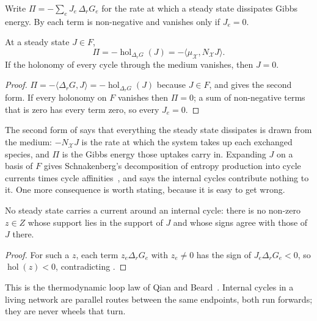 Write $\Pi=-\sum_e J_e\,\Delta_rG_e$ for the rate at which a steady state
dissipates Gibbs energy. By  each term is
non-negative and vanishes only if $J_e=0$. \lnkD

\begin{theorem}
\label{c1:thm-nocurrent}
\lnkD{} At a steady state $J\in F$,
\begin{equation}
\Pi=-\operatorname{hol}_{\Delta_rG}(J)
=-\langle\mu_{\mathcal X},N_{\mathcal X}J\rangle .
\label{c1:eq-power}
\end{equation}
If the holonomy of every cycle through the medium vanishes, then $J=0$.
\end{theorem}

\begin{proof}
$\Pi=-\langle\Delta_rG,J\rangle=-\operatorname{hol}_{\Delta_rG}(J)$ because
$J\in F$, and  gives the second form. If every holonomy
on $F$ vanishes then $\Pi=0$; a sum of non-negative terms that is zero has
every term zero, so every $J_e=0$.
\end{proof}

The second form of  says that everything the steady state
dissipates is drawn from the medium: $-N_{\mathcal X}J$ is the rate at which
the system takes up each exchanged species, and $\Pi$ is the Gibbs energy
those uptakes carry in. Expanding $J$ on a basis of $F$ gives Schnakenberg's
decomposition of entropy production into cycle currents times cycle
affinities~\citep{schnakenberg1976}, and  says the
internal cycles contribute nothing to it. \lnkS{} One more consequence is
worth stating, because it is easy to get wrong.

\begin{corollary}
\label{c1:cor-loop}
\lnkD{} No steady state carries a current around an internal cycle: there
is no non-zero $z\in Z$ whose support lies in the support of $J$ and whose
signs agree with those of $J$ there.
\end{corollary}

\begin{proof}
For such a $z$, each term $z_e\Delta_rG_e$ with $z_e\ne0$ has the sign of
$J_e\Delta_rG_e<0$, so $\operatorname{hol}(z)<0$, contradicting
.
\end{proof}

This is the thermodynamic loop law of Qian and Beard~\citep{qianbeard2005}.
Internal cycles in a living network are parallel routes between the same
endpoints, both run forwards; they are never wheels that turn.

